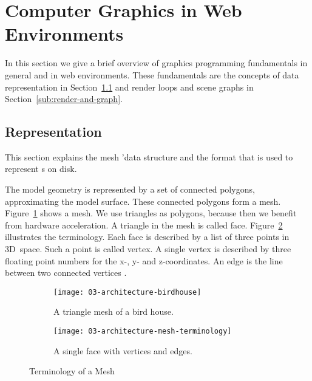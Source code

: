\documentclass[../../ClassicThesis.tex]{subfiles}
\begin{document}
\section{Computer Graphics in Web Environments}
\label{sec:cg-web}

In this section we give a brief overview of graphics programming
fundamentals in general and in web environments. These fundamentals
are the concepts of {\threedmodel} data representation in
Section~\ref{sub:model-representation} and render loops and scene
graphs in Section~\ref{sub:render-and-graph}.

\subsection{{\threedmodel} Representation}
\label{sub:model-representation}

This section explains the mesh 'data structure and the {\stlfile}
format that is used to represent {\threedmodel}s on disk.

The model geometry is represented by a set of connected
polygons, approximating the model surface. These connected
polygons form a mesh. Figure~\ref{fig:term-mesh:mesh} shows
a mesh. We use triangles as polygons, because then we
benefit from hardware acceleration. A triangle in the mesh
is called face. Figure~\ref{fig:term-mesh:face} illustrates
the terminology. Each face is described by a list of three
points in 3D~space. Such a point is called vertex. A single
vertex is described by three floating point numbers for the
x-, y- and z-coordinates. An edge is the line between two
connected vertices \cite[p.~3]{cg-intro}.

\begin{figure}[h]
  \centering
  \begin{subfigure}[b]{0.49\textwidth}
    \centering
    \texttt{[image: 03-architecture-birdhouse]}
    \caption{A triangle mesh of a bird house.}
    \label{fig:term-mesh:mesh}
  \end{subfigure}
  \begin{subfigure}[b]{0.49\textwidth}
    \centering
    \texttt{[image: 03-architecture-mesh-terminology]}
    \caption{A single face with vertices and edges.}
    \label{fig:term-mesh:face}
  \end{subfigure}
  \caption{Terminology of a Mesh}
  \label{fig:term-mesh}
\end{figure}
\end{document}
